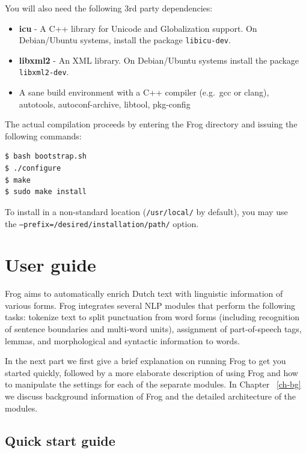 \documentclass{book}
\begin{document}
You will also need the following 3rd party dependencies:

\begin{itemize}
    \item \textbf{icu} - A C++ library for Unicode and Globalization support.
        On Debian/Ubuntu systems, install the package \texttt{libicu-dev}.
    \item \textbf{libxml2} - An XML library. On Debian/Ubuntu systems install
        the package \texttt{libxml2-dev}.
    \item A sane build environment with a C++ compiler (e.g.\ gcc or clang), autotools, autoconf-archive, libtool, pkg-config
\end{itemize}

The actual compilation proceeds by entering the Frog directory and issuing the following
commands:

\begin{verbatim}
$ bash bootstrap.sh
$ ./configure
$ make
$ sudo make install
\end{verbatim}

To install in a non-standard location (\texttt{/usr/local/} by default), you
may use \\ the \texttt{--prefix=/desired/installation/path/} option.

\chapter{User guide}
\label{ch-uguide}

Frog aims to automatically enrich Dutch text with linguistic information of various forms.
Frog integrates several NLP modules that perform the following tasks: tokenize
text to split punctuation from word forms (including recognition of sentence boundaries and
multi-word units), assignment of part-of-speech tags, lemmas, and morphological and
syntactic information to words.

In the next part we first give a brief explanation on running Frog to get you
started quickly, followed by a more elaborate description of using Frog and how
to manipulate the settings for each of the separate modules. In Chapter~
\ref{ch-bg} we discuss background information of Frog and the detailed
architecture of the modules.

\section{Quick start guide}
\end{document}
